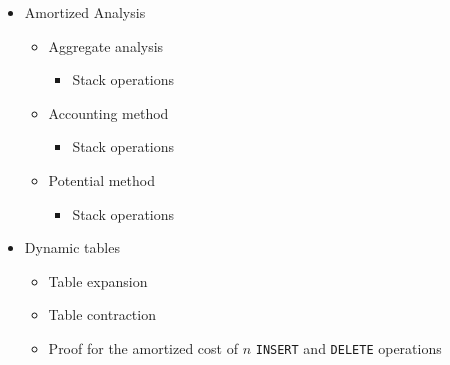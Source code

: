 \begin{itemize}
  \item Amortized Analysis
  \begin{itemize}
    \item Aggregate analysis
    \begin{itemize}
      \item Stack operations
    \end{itemize}
    \item Accounting method
    \begin{itemize}
      \item Stack operations
    \end{itemize}
    \item Potential method
    \begin{itemize}
      \item Stack operations
    \end{itemize}
  \end{itemize}
  \item Dynamic tables
  \begin{itemize}
    \item Table expansion
    \item Table contraction
    \item Proof for the amortized cost of $n$ \texttt{INSERT} and
    \texttt{DELETE} operations
  \end{itemize}
\end{itemize}
